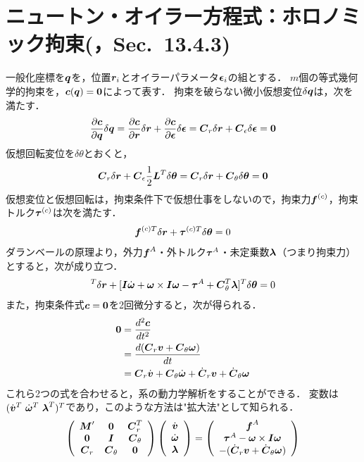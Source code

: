 \documentclass{jsarticle}
\begin{document}
\section{ニュートン・オイラー方程式：ホロノミック拘束(\cite{Book2006JSME}，Sec.~13.4.3)}
一般化座標を$\vq$を，位置$\vr_i$とオイラーパラメータ$\vepsilon_i$の組とする．
$m$個の等式幾何学的拘束を，$\vc(\vq)=\0$によって表す．
拘束を破らない微小仮想変位$\delta \vq$は，次を満たす．
\begin{align*}
\frac{\partial \vc}{\partial \vq} \delta \vq = \frac{\partial \vc}{\partial \vr} \delta \vr + \frac{\partial \vc}{\partial \vepsilon} \delta \vepsilon = \vC_r\delta \vr + \vC_\epsilon\delta \vepsilon = \0
\end{align*}
仮想回転変位を$\delta\theta$とおくと，
\begin{align*}
\vC_r\delta \vr + \vC_\epsilon \frac{1}{2}\vL^T \delta \vtheta = \vC_r\delta \vr + \vC_\theta \delta \vtheta =\0
\end{align*}
仮想変位と仮想回転は，拘束条件下で仮想仕事をしないので，拘束力$\vf^{(c)}$，拘束トルク$\vtau^{(c)}$は次を満たす．
\begin{align*}
\vf^{(c)T}\delta \vr + \vtau^{(c)T} \delta \vtheta = 0
\end{align*}
ダランベールの原理より，外力$\vf^A$・外トルク$\vtau^A$・未定乗数$\vlambda$（つまり拘束力）とすると，次が成り立つ．
\begin{align}
[\vM'\dot{\vv}-\vf^A+\vC_r^T\vlambda]^T\delta \vr + [\vI\dot{\vomega}+\vomega\times\vI\vomega-\vtau^A+\vC_\theta^T\vlambda]^T\delta \vtheta = 0
\end{align}
また，拘束条件式$\vc=\0$を2回微分すると，次が得られる．
\begin{align}
\0
&=\frac {d^2\vc}{dt^2}\notag\\
&=\frac {d(\vC_r\vv + \vC_\theta\vomega)}{dt}\notag\\
&=\vC_r\dot{\vv} + \vC_\theta\dot{\vomega} + \dot{\vC}_r\vv+\dot{\vC}_\theta\vomega
\end{align}
これら2つの式を合わせると，系の動力学解析をすることができる．
変数は$(\dot{\vv}^T~\dot{\vomega}^T~\vlambda^T)^T$であり，このような方法は"拡大法"として知られる．
\begin{align*}
   \left(
    \begin{array}{ccc}
       \vM'   & \0        & \vC_r^T\\
       \0    & \vI       & \vC_\theta\\
       \vC_r & \vC_\theta & \0
    \end{array}
   \right)
   \left(
    \begin{array}{c}
       \dot{\vv}\\
       \dot{\vomega}\\
       \vlambda
    \end{array}
   \right)
=
   \left(
    \begin{array}{c}
       \vf^A\\
       \vtau^A-\vomega\times\vI\vomega\\
       -(\dot{\vC}_r\vv + \dot{\vC}_\theta\vomega)
    \end{array}
   \right)
\end{align*}
\end{document}
